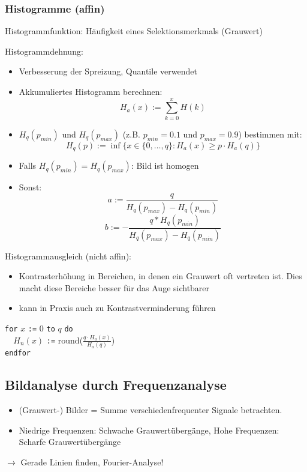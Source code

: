 \subsubsection{Histogramme (affin) }

Histogrammfunktion: Häufigkeit eines Selektionsmerkmals (Grauwert)

Histogrammdehnung:
\begin{itemize}
\item Verbesserung der Spreizung, Quantile verwendet
\item Akkumuliertes Histogramm berechnen: \[H_a(x):=\sum\limits_{k=0}^x H(k)\]
\item \(H_q(p_{min})\) und \(H_q(p_{max})\) (z.B. \(p_{min} = 0.1\) und \(p_{max} = 0.9\)) bestimmen mit: \[H_q(p) := \inf\{ x \in \{ 0, \dots ,q\}:H_a(x) \geq p \cdot H_a(q) \}\]
\item Falls \(H_q(p_{min}) = H_q(p_{max})\): Bild ist homogen
\item Sonst:
\[ a:=\frac{q}{H_q(p_{max}) - H_q(p_{min})} \]
\[ b:=-\frac{q*H_q(p_{min})}{H_q(p_{max}) - H_q(p_{min})} \]
\end{itemize}

Histogrammausgleich (nicht affin):
\begin{itemize}
	\item Kontrasterhöhung in Bereichen, in denen ein Grauwert oft vertreten ist. Dies macht diese Bereiche besser für das Auge sichtbarer
	\item kann in Praxis auch zu Kontrastverminderung führen
\end{itemize}
\verb|for| $x$ \verb|:=| $0$ \verb|to| $q$ \verb|do| \\
\verb|  |$H_n(x)$ \verb|:=| round($\frac{q \cdot H_a(x)}{H_a(q)}$) \\
\verb|endfor|

\subsection{Bildanalyse durch Frequenzanalyse}

\begin{itemize}
\item (Grauwert-) Bilder = Summe verschiedenfrequenter Signale betrachten.
\item Niedrige Frequenzen: Schwache Grauwertübergänge, Hohe Frequenzen: Scharfe Grauwertübergänge
\end{itemize}
$\to$ Gerade Linien finden, Fourier-Analyse!

